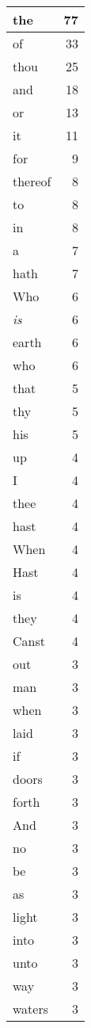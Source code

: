 \begin{center}
\begin{longtable}{l|r}
\hline \hline
\endlastfoot
the & 77 \\ \hline
of & 33 \\ \hline
thou & 25 \\ \hline
and & 18 \\ \hline
or & 13 \\ \hline
it & 11 \\ \hline
for & 9 \\ \hline
thereof & 8 \\ \hline
to & 8 \\ \hline
in & 8 \\ \hline
a & 7 \\ \hline
hath & 7 \\ \hline
Who & 6 \\ \hline
\emph{is} & 6 \\ \hline
earth & 6 \\ \hline
who & 6 \\ \hline
that & 5 \\ \hline
thy & 5 \\ \hline
his & 5 \\ \hline
up & 4 \\ \hline
I & 4 \\ \hline
thee & 4 \\ \hline
hast & 4 \\ \hline
When & 4 \\ \hline
Hast & 4 \\ \hline
is & 4 \\ \hline
they & 4 \\ \hline
Canst & 4 \\ \hline
out & 3 \\ \hline
man & 3 \\ \hline
when & 3 \\ \hline
laid & 3 \\ \hline
if & 3 \\ \hline
doors & 3 \\ \hline
forth & 3 \\ \hline
And & 3 \\ \hline
no & 3 \\ \hline
be & 3 \\ \hline
as & 3 \\ \hline
light & 3 \\ \hline
into & 3 \\ \hline
unto & 3 \\ \hline
way & 3 \\ \hline
waters & 3 \\ \hline

\end{longtable}
\end{center}
